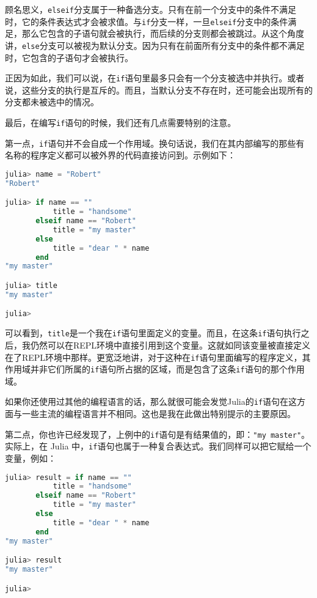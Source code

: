顾名思义，\verb|elseif|分支属于一种备选分支。只有在前一个分支中的条件不满足时，它的条件表达式才会被求值。与\verb|if|分支一样，一旦\verb|elseif|分支中的条件满足，那么它包含的子语句就会被执行，而后续的分支则都会被跳过。从这个角度讲，\verb|else|分支可以被视为默认分支。因为只有在前面所有分支中的条件都不满足时，它包含的子语句才会被执行。

正因为如此，我们可以说，在\verb|if|语句里最多只会有一个分支被选中并执行。或者说，这些分支的执行是互斥的。而且，当默认分支不存在时，还可能会出现所有的分支都未被选中的情况。

最后，在编写\verb|if|语句的时候，我们还有几点需要特别的注意。

第一点，\verb|if|语句并不会自成一个作用域。换句话说，我们在其内部编写的那些有名称的程序定义都可以被外界的代码直接访问到。示例如下：

\begin{lstlisting}[language=julia]
julia> name = "Robert"
"Robert"

julia> if name == ""
           title = "handsome"
       elseif name == "Robert"
           title = "my master"
       else
           title = "dear " * name
       end
"my master"

julia> title
"my master"

julia> 
\end{lstlisting}

可以看到，\verb|title|是一个我在\verb|if|语句里面定义的变量。而且，在这条\verb|if|语句执行之后，我仍然可以在REPL环境中直接引用到这个变量。这就如同该变量被直接定义在了REPL环境中那样。更宽泛地讲，对于这种在\verb|if|语句里面编写的程序定义，其作用域并非它们所属的\verb|if|语句所占据的区域，而是包含了这条\verb|if|语句的那个作用域。

如果你还使用过其他的编程语言的话，那么就很可能会发觉Julia的\verb|if|语句在这方面与一些主流的编程语言并不相同。这也是我在此做出特别提示的主要原因。

第二点，你也许已经发现了，上例中的\verb|if|语句是有结果值的，即：\verb|"my master"|。实际上，在 Julia 中，\verb|if|语句也属于一种复合表达式。我们同样可以把它赋给一个变量，例如：

\begin{lstlisting}[language=julia]
julia> result = if name == ""
           title = "handsome"
       elseif name == "Robert"
           title = "my master"
       else
           title = "dear " * name
       end
"my master"

julia> result
"my master"

julia> 
\end{lstlisting}


